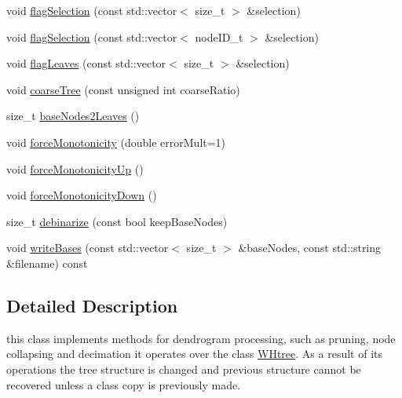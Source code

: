 \begin{DoxyCompactItemize}
\item 
void \hyperlink{classWHtreeProcesser_a62fae5d7523c1070037a28e26ebea5b4}{flag\-Selection} (const std\-::vector$<$ size\-\_\-t $>$ \&selection)
\item 
void \hyperlink{classWHtreeProcesser_ac3b8141a258aaa8ce9c24a963c8c9787}{flag\-Selection} (const std\-::vector$<$ node\-I\-D\-\_\-t $>$ \&selection)
\item 
void \hyperlink{classWHtreeProcesser_a85c6078029a21790d971b9844b6e3d42}{flag\-Leaves} (const std\-::vector$<$ size\-\_\-t $>$ \&selection)
\item 
void \hyperlink{classWHtreeProcesser_a8a2c9af01167829a700c7636cb49c233}{coarse\-Tree} (const unsigned int coarse\-Ratio)
\item 
size\-\_\-t \hyperlink{classWHtreeProcesser_a7983329a6fc2c21808248cfe6770d6cb}{base\-Nodes2\-Leaves} ()
\item 
void \hyperlink{classWHtreeProcesser_aeb9cb7cd90dfd93c3b34baafd5062df0}{force\-Monotonicity} (double error\-Mult=1)
\item 
void \hyperlink{classWHtreeProcesser_a89c480d1eab0e1a5984943a7d1b8e253}{force\-Monotonicity\-Up} ()
\item 
void \hyperlink{classWHtreeProcesser_a3ff8b1f12f16b04b24be89dc68f91dfe}{force\-Monotonicity\-Down} ()
\item 
size\-\_\-t \hyperlink{classWHtreeProcesser_a5916429f62f1062da9ee91d8e8e576e2}{debinarize} (const bool keep\-Base\-Nodes)
\item 
void \hyperlink{classWHtreeProcesser_a1e304707e0f1a65d73864f9affdb5ccb}{write\-Bases} (const std\-::vector$<$ size\-\_\-t $>$ \&base\-Nodes, const std\-::string \&filename) const 
\end{DoxyCompactItemize}


\subsection{\-Detailed \-Description}
this class implements methods for dendrogram processing, such as pruning, node collapsing and decimation it operates over the class \hyperlink{classWHtree}{\-W\-Htree}. \-As a result of its operations the tree structure is changed and previous structure cannot be recovered unless a class copy is previously made. 

